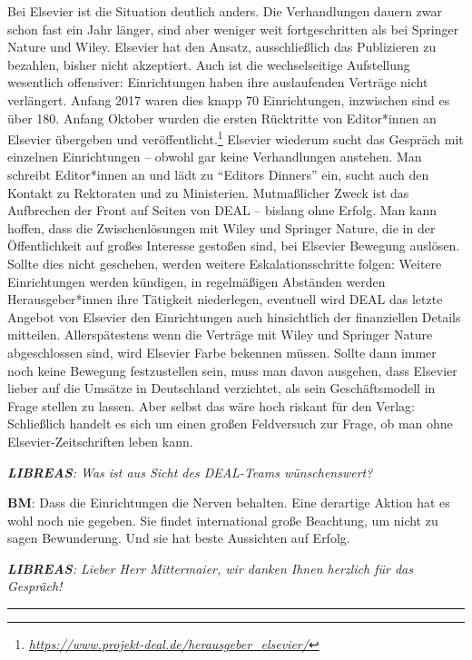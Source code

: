 \documentclass[a4paper,
fontsize=11pt,
oneside,
numbers=noperiodatend,
parskip=half-,
bibliography=totoc,
final
]{scrartcl}
\begin{document}
Bei Elsevier ist die Situation deutlich anders. Die Verhandlungen dauern
zwar schon fast ein Jahr länger, sind aber weniger weit fortgeschritten
als bei Springer Nature und Wiley. Elsevier hat den Ansatz,
ausschließlich das Publizieren zu bezahlen, bisher nicht akzeptiert.
Auch ist die wechselseitige Aufstellung wesentlich offensiver:
Einrichtungen haben ihre auslaufenden Verträge nicht verlängert. Anfang
2017 waren dies knapp 70 Einrichtungen, inzwischen sind es über 180.
Anfang Oktober wurden die ersten Rücktritte von Editor*innen an Elsevier
übergeben und veröffentlicht.\footnote{\href{https://www.projekt-deal.de/herausgeber_elsevier/}{\emph{https://www.projekt-deal.de/herausgeber\_elsevier/}}}
Elsevier wiederum sucht das Gespräch mit einzelnen Einrichtungen --
obwohl gar keine Verhandlungen anstehen. Man schreibt Editor*innen an
und lädt zu \enquote{Editors Dinners} ein, sucht auch den Kontakt zu
Rektoraten und zu Ministerien. Mutmaßlicher Zweck ist das Aufbrechen der
Front auf Seiten von DEAL -- bislang ohne Erfolg. Man kann hoffen, dass
die Zwischenlösungen mit Wiley und Springer Nature, die in der
Öffentlichkeit auf großes Interesse gestoßen sind, bei Elsevier Bewegung
auslösen. Sollte dies nicht geschehen, werden weitere
Eskalationsschritte folgen: Weitere Einrichtungen werden kündigen, in
regelmäßigen Abständen werden Herausgeber*innen ihre Tätigkeit
niederlegen, eventuell wird DEAL das letzte Angebot von Elsevier den
Einrichtungen auch hinsichtlich der finanziellen Details mitteilen.
Allerspätestens wenn die Verträge mit Wiley und Springer Nature
abgeschlossen sind, wird Elsevier Farbe bekennen müssen. Sollte dann
immer noch keine Bewegung festzustellen sein, muss man davon ausgehen,
dass Elsevier lieber auf die Umsätze in Deutschland verzichtet, als sein
Geschäftsmodell in Frage stellen zu lassen. Aber selbst das wäre hoch
riskant für den Verlag: Schließlich handelt es sich um einen großen
Feldversuch zur Frage, ob man ohne Elsevier-Zeitschriften leben kann.

\emph{\textbf{LIBREAS}: Was ist aus Sicht des DEAL-Teams wünschenswert?}

\textbf{BM}: Dass die Einrichtungen die Nerven behalten. Eine derartige
Aktion hat es wohl noch nie gegeben. Sie findet international große
Beachtung, um nicht zu sagen Bewunderung. Und sie hat beste Aussichten
auf Erfolg.

\emph{\textbf{LIBREAS}: Lieber Herr Mittermaier, wir danken Ihnen
herzlich für das Gespräch!}

\begin{center}\rule{0.5\linewidth}{\linethickness}\end{center}
\end{document}
